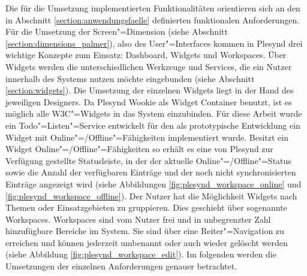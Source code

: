 Die für die Umsetzung implementierten Funktionalitäten orientieren sich an den in Abschnitt \ref{section:anwendungsfaelle} definierten funktionalen Anforderungen. Für die Umsetzung der Screen"=Dimension (siehe Abschnitt \ref{section:dimensions_palmer}), also des User"=Interfaces kommen in Plesynd drei wichtige Konzepte zum Einsatz: Dashboard, Widgets und Workspaces. Über Widgets werden die unterschiedlichen Werkzeuge und Services, die ein Nutzer innerhalb des Systems nutzen möchte eingebunden (siehe Abschnitt \ref{section:widgets}). Die Umsetzung der einzelnen Widgets liegt in der Hand des jeweiligen Designers. Da Plesynd Wookie als Widget Container benutzt, ist es möglich alle W3C"=Widgets in das System einzubinden. Für diese Arbeit wurde ein Todo"=Listen"=Service entwickelt für den als prototypische Entwicklung ein Widget mit Online"=/Offline"=Fähigkeiten implementiert wurde. Besitzt ein Widget Online"=/Offline"=Fähigkeiten so erhält es eine von Plesynd zur Verfügung gestellte Statusleiste, in der der aktuelle Online"=/Offline"=Status sowie die Anzahl der verfügbaren Einträge und der noch nicht synchronisierten Einträge angezeigt wird (siehe Abbildungen \ref{fig:plesynd_workspace_online} und \ref{fig:plesynd_workspace_offline}). Der Nutzer hat die Möglichkeit Widgets nach Themen oder Einsatzgebieten zu gruppieren. Dies geschieht über sogenannte Workspaces. Workspaces sind vom Nutzer frei und in unbegrenzter Zahl hinzufügbare Bereiche im System. Sie sind über eine Reiter"=Navigation zu erreichen und können jederzeit umbenannt oder auch wieder gelöscht werden (siehe Abbildung \ref{fig:plesynd_workspace_edit}). Im folgenden werden die Umsetzungen der einzelnen Anforderungen genauer betrachtet.


